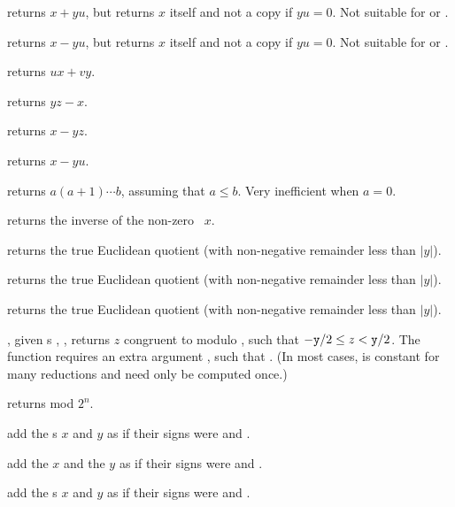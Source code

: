  returns $x +yu$, but
returns $x$ itself and not a copy if $yu = 0$. Not suitable for
 or .

 returns $x- yu$, but
returns $x$ itself and not a copy if $yu = 0$. Not suitable for
 or .

 returns $ux + vy$.

 returns $yz - x$.

 returns $x - yz$.

 returns $x -yu$.

 returns $a(a+1)\cdots b$, assuming
that $a \leq b$. Very inefficient when $a = 0$.

 returns the inverse of the non-zero ~$x$.

 returns the true Euclidean quotient
(with non-negative remainder less than $|y|$).

 returns the true Euclidean quotient
(with non-negative remainder less than $|y|$).

 returns the true Euclidean quotient
(with non-negative remainder less than $|y|$).

, given
s , , returns $z$ congruent to  modulo ,
such that $-{\tt y}/2 \leq z < {\tt y}/2$. The function requires an extra
argument , such that . (In most cases, 
is constant for many reductions and  need only be computed once.)

 returns  mod $2^n$.

 add the s
$x$ and $y$ as if their signs were  and .

add the  $x$ and the  $y$ as if their signs were 
and .

 add the s $x$
and $y$ as if their signs were  and .

